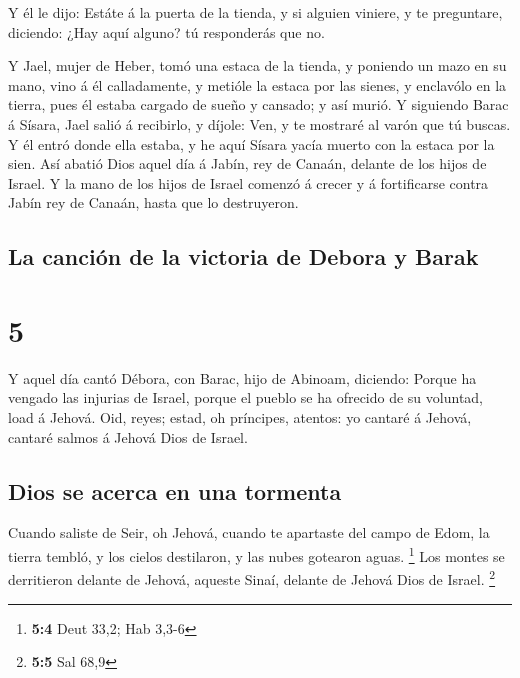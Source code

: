  Y él le dijo: Estáte á la puerta de la tienda, y si
alguien viniere, y te preguntare, diciendo: ¿Hay aquí alguno? tú
responderás que no.

 Y Jael, mujer de Heber, tomó una estaca de la tienda, y
poniendo un mazo en su mano, vino á él calladamente, y metióle la estaca
por las sienes, y enclavólo en la tierra, pues él estaba cargado de
sueño y cansado; y así murió.  Y siguiendo Barac á Sísara,
Jael salió á recibirlo, y díjole: Ven, y te mostraré al varón que tú
buscas. Y él entró donde ella estaba, y he aquí Sísara yacía muerto con
la estaca por la sien.  Así abatió Dios aquel día á Jabín,
rey de Canaán, delante de los hijos de Israel.  Y la mano
de los hijos de Israel comenzó á crecer y á fortificarse contra Jabín
rey de Canaán, hasta que lo destruyeron.

\hypertarget{la-canciuxf3n-de-la-victoria-de-debora-y-barak}{%
\subsection{La canción de la victoria de Debora y
Barak}\label{la-canciuxf3n-de-la-victoria-de-debora-y-barak}}

\hypertarget{section-4}{%
\section{5}\label{section-4}}

 Y aquel día cantó Débora, con Barac, hijo de Abinoam,
diciendo:  Porque ha vengado las injurias de Israel, porque
el pueblo se ha ofrecido de su voluntad, load á Jehová. 
Oid, reyes; estad, oh príncipes, atentos: yo cantaré á Jehová, cantaré
salmos á Jehová Dios de Israel.

\hypertarget{dios-se-acerca-en-una-tormenta}{%
\subsection{Dios se acerca en una
tormenta}\label{dios-se-acerca-en-una-tormenta}}

 Cuando saliste de Seir, oh Jehová, cuando te apartaste del
campo de Edom, la tierra tembló, y los cielos destilaron, y las nubes
gotearon aguas. \footnote{\textbf{5:4} Deut 33,2; Hab 3,3-6}
 Los montes se derritieron delante de Jehová, aqueste Sinaí,
delante de Jehová Dios de Israel. \footnote{\textbf{5:5} Sal 68,9}

